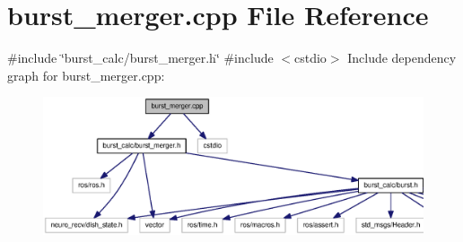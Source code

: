 \section{burst\-\_\-merger.\-cpp \-File \-Reference}
\label{burst__merger_8cpp}
{\ttfamily \#include \char`\"{}burst\-\_\-calc/burst\-\_\-merger.\-h\char`\"{}}\*
{\ttfamily \#include $<$cstdio$>$}\*
\-Include dependency graph for burst\-\_\-merger.\-cpp\-:\nopagebreak
\begin{figure}[H]
\begin{center}
\leavevmode
\includegraphics[width=350pt]{burst__merger_8cpp__incl}
\end{center}
\end{figure}
